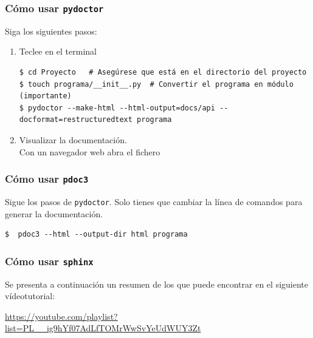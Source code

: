 \subsubsection{Cómo usar \texttt{pydoctor}}

Siga los siguientes pasos:
\begin{enumerate}[nosep]
	\item Teclee en el terminal
\begin{Verbatim}
$ cd Proyecto   # Asegúrese que está en el directorio del proyecto
$ touch programa/__init__.py  # Convertir el programa en módulo (importante)
$ pydoctor --make-html --html-output=docs/api --docformat=restructuredtext programa
\end{Verbatim}


	
\item Visualizar la documentación. \\
Con un navegador web abra el fichero 
\end{enumerate}



\subsubsection{Cómo usar \texttt{pdoc3}}

Sigue los pasos de \texttt{pydoctor}. Solo tienes que cambiar la línea de comandos para generar la documentación.

\begin{Verbatim}
$  pdoc3 --html --output-dir html programa
\end{Verbatim}




\subsubsection{Cómo usar \texttt{sphinx}}

Se presenta a continuación un resumen de los que puede encontrar en el siguiente vídeotutorial:

\hfil
\url{https://youtube.com/playlist?list=PL__ig9hYf07AdLfTOMrWwSvYeUdWUY3Zt}

